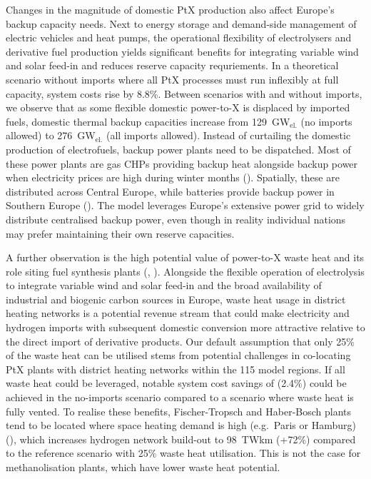 
Changes in the magnitude of domestic PtX production also affect Europe's backup
capacity needs. Next to energy storage and demand-side management of electric
vehicles and heat pumps, the operational flexibility of electrolysers and
derivative fuel production yields significant benefits for integrating variable
wind and solar feed-in and reduces reserve capacity requriements. In a
theoretical scenario without imports where all PtX processes must run inflexibly
at full capacity, system costs rise by 8.8\%. Between scenarios with and without
imports, we observe that as some flexible domestic power-to-X is displaced by
imported fuels, domestic thermal backup capacities increase from
129~GW$_\text{el.}$ (no imports allowed) to 276~GW$_\text{el.}$ (all imports
allowed).  Instead of curtailing the domestic production of electrofuels, backup
power plants need to be dispatched. Most of these power plants are gas CHPs
providing backup heat alongside backup power when electricity prices are high
during winter months (). Spatially, these are
distributed across Central Europe, while batteries provide backup power in
Southern Europe (). The model leverages
Europe's extensive power grid to widely distribute centralised backup power,
even though in reality individual nations may prefer maintaining their own
reserve capacities.


A further observation is the high potential value of power-to-X waste heat and
its role siting fuel synthesis plants (,
). Alongside the flexible operation of electrolysis to
integrate variable wind and solar feed-in and the broad availability of
industrial and biogenic carbon sources in Europe, waste heat usage in district
heating networks is a potential revenue stream that could make electricity and
hydrogen imports with subsequent domestic conversion more attractive relative to
the direct import of derivative products. Our default assumption that only 25\%
of the waste heat can be utilised stems from potential challenges in co-locating
PtX plants with district heating networks within the 115 model regions. If all
waste heat could be leveraged, notable system cost savings of 
(2.4\%) could be achieved in the no-imports scenario compared to a scenario
where waste heat is fully vented.  To realise these benefits, Fischer-Tropsch
and Haber-Bosch plants tend to be located where space heating demand is high
(e.g.~Paris or Hamburg) (), which increases hydrogen
network build-out to 98~TWkm (+72\%) compared to the reference scenario with
25\% waste heat utilisation. This is not the case for methanolisation plants,
which have lower waste heat potential.

